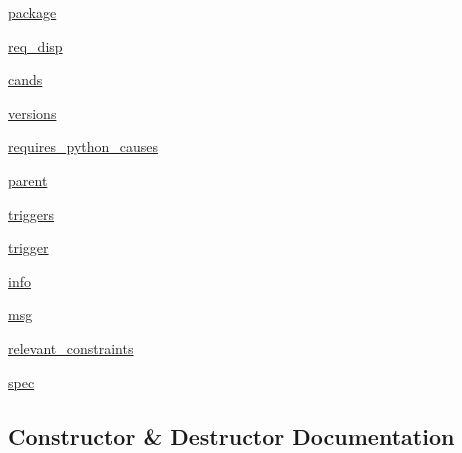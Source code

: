 \begin{DoxyCompactItemize}
\item 
\hyperlink{classpip_1_1__internal_1_1resolution_1_1resolvelib_1_1factory_1_1Factory_a03454fc844943a3d740a87735ed96982}{package}
\item 
\hyperlink{classpip_1_1__internal_1_1resolution_1_1resolvelib_1_1factory_1_1Factory_ad162d0b46b613234992ee01904e47624}{req\+\_\+disp}
\item 
\hyperlink{classpip_1_1__internal_1_1resolution_1_1resolvelib_1_1factory_1_1Factory_ac5084b355adb4ae6a5fa7b0b2800cbaf}{cands}
\item 
\hyperlink{classpip_1_1__internal_1_1resolution_1_1resolvelib_1_1factory_1_1Factory_a372026812ecf3032c1d0fb66673af7a0}{versions}
\item 
\hyperlink{classpip_1_1__internal_1_1resolution_1_1resolvelib_1_1factory_1_1Factory_aeca31b36df9524c8a83516307ee97c53}{requires\+\_\+python\+\_\+causes}
\item 
\hyperlink{classpip_1_1__internal_1_1resolution_1_1resolvelib_1_1factory_1_1Factory_a1b93f26e83dc318e6cae25e9d4fa1c7f}{parent}
\item 
\hyperlink{classpip_1_1__internal_1_1resolution_1_1resolvelib_1_1factory_1_1Factory_a44174e712a99d0457a5f3c165379fe31}{triggers}
\item 
\hyperlink{classpip_1_1__internal_1_1resolution_1_1resolvelib_1_1factory_1_1Factory_ae16ad8212c9370dacb7b4915604335fb}{trigger}
\item 
\hyperlink{classpip_1_1__internal_1_1resolution_1_1resolvelib_1_1factory_1_1Factory_a772ad621d01b1077cd04f9e00b57a1a8}{info}
\item 
\hyperlink{classpip_1_1__internal_1_1resolution_1_1resolvelib_1_1factory_1_1Factory_ac1d15b24f949967a1b54e73c8ec10c9f}{msg}
\item 
\hyperlink{classpip_1_1__internal_1_1resolution_1_1resolvelib_1_1factory_1_1Factory_a5bee1f369f8d13b12530b0b2dc36ccbb}{relevant\+\_\+constraints}
\item 
\hyperlink{classpip_1_1__internal_1_1resolution_1_1resolvelib_1_1factory_1_1Factory_adc74b7fa505123fa33e803c92ddaa213}{spec}
\end{DoxyCompactItemize}


\subsection{Constructor \& Destructor Documentation}
\mbox{\label{classpip_1_1__internal_1_1resolution_1_1resolvelib_1_1factory_1_1Factory_ac89aed07a8ff139528f601e87647390a}} 
